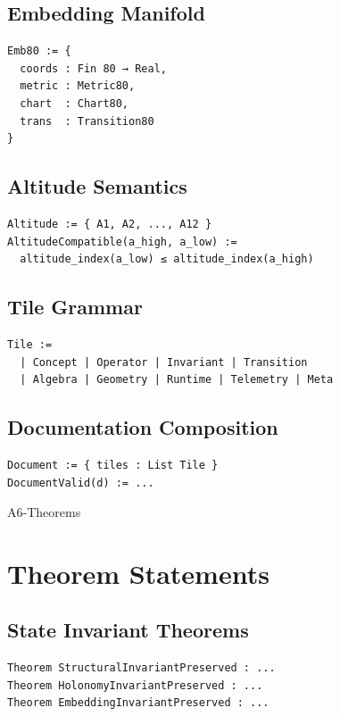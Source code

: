 \documentclass[11pt]{article}
\begin{document}
\subsection{Embedding Manifold}
\begin{verbatim}
Emb80 := {
  coords : Fin 80 → Real,
  metric : Metric80,
  chart  : Chart80,
  trans  : Transition80
}
\end{verbatim}

\subsection{Altitude Semantics}
\begin{verbatim}
Altitude := { A1, A2, ..., A12 }
AltitudeCompatible(a_high, a_low) :=
  altitude_index(a_low) ≤ altitude_index(a_high)
\end{verbatim}

\subsection{Tile Grammar}
\begin{verbatim}
Tile :=
  | Concept | Operator | Invariant | Transition
  | Algebra | Geometry | Runtime | Telemetry | Meta
\end{verbatim}

\subsection{Documentation Composition}
\begin{verbatim}
Document := { tiles : List Tile }
DocumentValid(d) := ...
\end{verbatim}

\newpage


\begin{citationmembrane}{A6-Theorems}
\end{citationmembrane}

\section{Theorem Statements}

\subsection{State Invariant Theorems}
\begin{verbatim}
Theorem StructuralInvariantPreserved : ...
Theorem HolonomyInvariantPreserved : ...
Theorem EmbeddingInvariantPreserved : ...
\end{verbatim}
\end{document}
